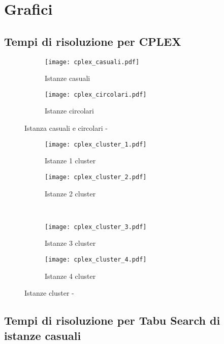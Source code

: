 \clearpage
\section{Grafici}
\label{sec:grafici}

\subsection{Tempi di risoluzione per CPLEX}

\begin{figure}[H]
	\centering
	\begin{subfigure}[b]{.45\textwidth}
		\texttt{[image: cplex\_casuali.pdf]}
		\caption{Istanze casuali}
		\label{fig:casuali cplex}
	\end{subfigure}
	\quad
	\begin{subfigure}[b]{.45\textwidth}
		\texttt{[image: cplex\_circolari.pdf]}
		\caption{Istanze circolari}
		\label{fig:circolari cplex}
	\end{subfigure}
	\caption{Istanza casuali e circolari - }
	\label{fig:casuali circolari cplex}
\end{figure}

\begin{figure}[H]
	\centering
	\begin{subfigure}[b]{.45\textwidth}
		\texttt{[image: cplex\_cluster\_1.pdf]}
		\caption{Istanze 1 cluster}
	\end{subfigure}
	\quad
	\begin{subfigure}[b]{.45\textwidth}
		\texttt{[image: cplex\_cluster\_2.pdf]}
		\caption{Istanze 2 cluster}
	\end{subfigure}
	\\
	\begin{subfigure}[b]{.45\textwidth}
		\texttt{[image: cplex\_cluster\_3.pdf]}
		\caption{Istanze 3 cluster}
	\end{subfigure}
	\quad
	\begin{subfigure}[b]{.45\textwidth}
		\texttt{[image: cplex\_cluster\_4.pdf]}
		\caption{Istanze 4 cluster}
	\end{subfigure}
	\caption{Istanze cluster - }
	\label{fig:cluster cplex}
\end{figure}


\subsection{Tempi di risoluzione per Tabu Search di istanze casuali}

